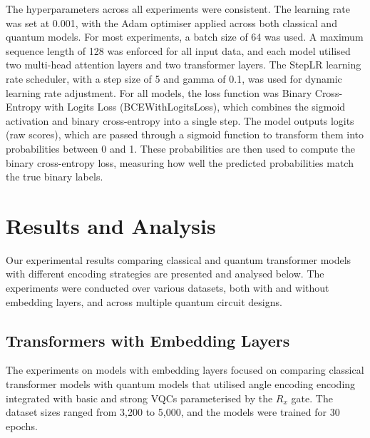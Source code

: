 The hyperparameters across all experiments were consistent. The
learning rate was set at 0.001, with the Adam optimiser applied
across both classical and quantum models. For most experiments, a
batch size of 64 was used. A maximum sequence length of 128 was
enforced for all input data, and each model utilised two multi-head
attention layers and two transformer layers. The StepLR learning rate
scheduler, with a step size of 5 and gamma of 0.1, was used for
dynamic learning rate adjustment. For all models, the loss function
was Binary Cross-Entropy with Logits Loss (BCEWithLogitsLoss), which
combines the sigmoid activation and binary cross-entropy into a
single step. The model outputs logits (raw scores), which are passed
through a sigmoid function to transform them into probabilities
between 0 and 1. These probabilities are then used to compute the
binary cross-entropy loss, measuring how well the predicted
probabilities match the true binary labels.

\section{Results and Analysis}
\label{sec:results_analysis}
Our experimental results comparing classical and quantum transformer
models with different encoding strategies are presented and analysed
below. The experiments were conducted over various datasets, both
with and without embedding layers, and across multiple quantum circuit designs.

\subsection{Transformers with Embedding Layers}
\label{subsec:transformers_with_embedding_layers}
The experiments on models with embedding layers focused on comparing
classical transformer models with quantum models that utilised angle
encoding encoding integrated with basic and strong \glspl{VQC}
parameterised by the \(R_x\) gate. The
dataset sizes ranged from 3,200 to 5,000, and the models were trained
for 30 epochs.

